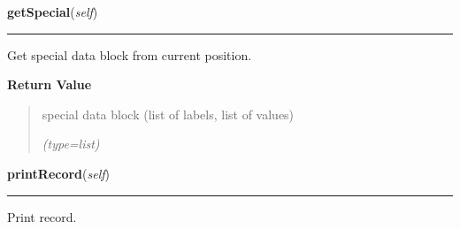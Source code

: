 \hspace{.8\funcindent}\begin{boxedminipage}{\funcwidth}

    \raggedright \textbf{getSpecial}(\textit{self})

    \vspace{-1.5ex}

    \rule{\textwidth}{0.5\fboxrule}
\setlength{\parskip}{2ex}
    Get special data block from current position.

\setlength{\parskip}{1ex}
      \textbf{Return Value}
    \vspace{-1ex}

      \begin{quote}
      special data block (list of labels, list of values)

      {\it (type=list)}

      \end{quote}

    \end{boxedminipage}

    \label{mille:MilleRecord:printRecord}

    \vspace{0.5ex}

\hspace{.8\funcindent}\begin{boxedminipage}{\funcwidth}

    \raggedright \textbf{printRecord}(\textit{self})

    \vspace{-1.5ex}

    \rule{\textwidth}{0.5\fboxrule}
\setlength{\parskip}{2ex}
    Print record.

\setlength{\parskip}{1ex}
    \end{boxedminipage}

    \label{mille:MilleRecord:writeRecord}

    \vspace{0.5ex}

